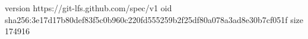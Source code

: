 version https://git-lfs.github.com/spec/v1
oid sha256:3e17d17b80def83f5c0b960c220fd555259b2f25df80a078a3ad8e30b7cf051f
size 174916

